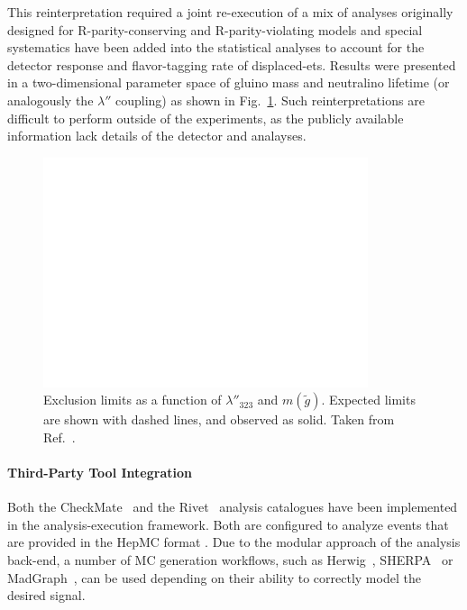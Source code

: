 This reinterpretation required a joint re-execution of a mix of analyses originally designed for R-parity-conserving and R-parity-violating models and special systematics have been added into the statistical analyses to account for the detector response and flavor-tagging rate of displaced-ets. Results were presented in a two-dimensional parameter space of gluino mass and neutralino lifetime (or analogously the $\lambda''$ coupling) as shown in Fig.~\ref{fig:rpvrpc}. Such reinterpretations are difficult to perform outside of the experiments, as the publicly available information lack details of the detector and analayses.

\begin{figure}[h]
\begin{center}
\includegraphics[width=0.85\textwidth,angle=0]{ch5-figures/fig_04.pdf}
\end{center}
\caption{Exclusion limits as a function of $\lambda''_{323}$ and $m({\tilde{g}})$. Expected limits are shown with dashed lines, and observed as solid. Taken from Ref.~\cite{ATLAS-CONF-2018-003}.}
\label{fig:rpvrpc}
\end{figure}



\paragraph{Third-Party Tool Integration }

Both the CheckMate~\cite{Drees:2013wra,Dercks:2016npn} and the Rivet~\cite{Buckley:2010ar} analysis catalogues have been implemented in the analysis-execution framework. Both are configured to analyze events that are provided in the HepMC format
\cite{Dobbs:2001ck}. Due to the modular approach of the analysis back-end, a number of MC generation workflows, such as Herwig~\cite{Marchesini:1991ch}, SHERPA~\cite{Gleisberg:2008ta} or MadGraph~\cite{Alwall:2011uj}, can be used depending on their ability to correctly model the desired signal.

